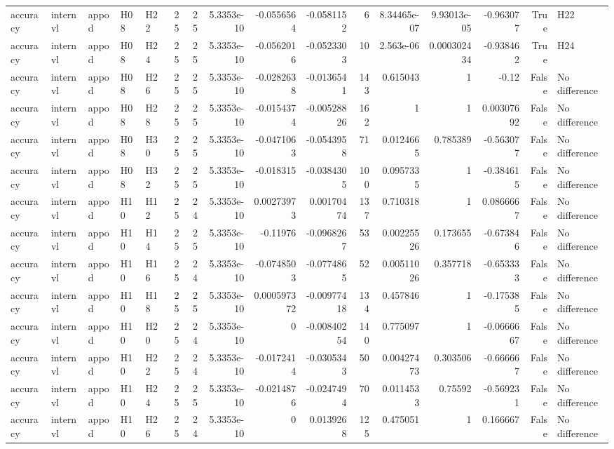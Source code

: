 \begin{longtable}{lllllrrrrrrrrrrl}
accuracy & internvl & appod & H08 & H22 & 25 & 25 & 5.3353e-10 & -0.0556564 & -0.0581152 & 6 & 8.34465e-07 & 9.93013e-05 & -0.963077 & True & H22 \\
accuracy & internvl & appod & H08 & H24 & 25 & 25 & 5.3353e-10 & -0.0562016 & -0.0523303 & 10 & 2.563e-06 & 0.000302434 & -0.938462 & True & H24 \\
accuracy & internvl & appod & H08 & H26 & 25 & 25 & 5.3353e-10 & -0.0282638 & -0.0136541 & 143 & 0.615043 & 1 & -0.12 & False & No difference \\
accuracy & internvl & appod & H08 & H28 & 25 & 25 & 5.3353e-10 & -0.0154374 & -0.00528826 & 162 & 1 & 1 & 0.00307692 & False & No difference \\
accuracy & internvl & appod & H08 & H30 & 25 & 25 & 5.3353e-10 & -0.0471063 & -0.0543958 & 71 & 0.0124665 & 0.785389 & -0.563077 & False & No difference \\
accuracy & internvl & appod & H08 & H32 & 25 & 25 & 5.3353e-10 & -0.018315 & -0.0384305 & 100 & 0.0957335 & 1 & -0.384615 & False & No difference \\
accuracy & internvl & appod & H10 & H12 & 25 & 24 & 5.3353e-10 & 0.00273973 & 0.00170474 & 137 & 0.710318 & 1 & 0.0866667 & False & No difference \\
accuracy & internvl & appod & H10 & H14 & 25 & 25 & 5.3353e-10 & -0.11976 & -0.0968267 & 53 & 0.00225526 & 0.173655 & -0.673846 & False & No difference \\
accuracy & internvl & appod & H10 & H16 & 25 & 24 & 5.3353e-10 & -0.0748503 & -0.0774865 & 52 & 0.00511026 & 0.357718 & -0.653333 & False & No difference \\
accuracy & internvl & appod & H10 & H18 & 25 & 25 & 5.3353e-10 & 0.000597372 & -0.00977418 & 134 & 0.457846 & 1 & -0.175385 & False & No difference \\
accuracy & internvl & appod & H10 & H20 & 25 & 24 & 5.3353e-10 & 0 & -0.00840254 & 140 & 0.775097 & 1 & -0.0666667 & False & No difference \\
accuracy & internvl & appod & H10 & H22 & 25 & 24 & 5.3353e-10 & -0.0172414 & -0.0305343 & 50 & 0.00427473 & 0.303506 & -0.666667 & False & No difference \\
accuracy & internvl & appod & H10 & H24 & 25 & 25 & 5.3353e-10 & -0.0214876 & -0.0247494 & 70 & 0.0114533 & 0.75592 & -0.569231 & False & No difference \\
accuracy & internvl & appod & H10 & H26 & 25 & 24 & 5.3353e-10 & 0 & 0.0139268 & 125 & 0.475051 & 1 & 0.166667 & False & No difference \\

\end{longtable}
